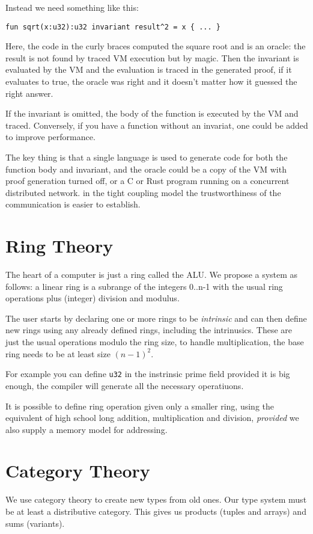 \documentclass[oneside]{book}
\theoremstyle{plain}
\theoremstyle{definition}
\theoremstyle{plain}
\begin{document}
Instead we need something like this:
\begin{verbatim}
fun sqrt(x:u32):u32 invariant result^2 = x { ... }
\end{verbatim}
Here, the code in the curly braces computed the square root
and is an oracle: the result is not found by traced VM execution
but by magic. Then the invariant is evaluated by the VM and
the evaluation is traced in the generated proof, if it evaluates
to true, the oracle was right and it doesn't matter how it guessed
the right answer.


If the invariant is omitted, the body of the function is executed
by the VM and traced. Conversely, if you have a function without
an invariat, one could be added to improve performance.

The key thing is that a single language is used to generate code for
both the function body and invariant, and the oracle could be a copy
of the VM with proof generation turned off, or a C or Rust program
running on a concurrent distributed network. in the tight coupling
model the trustworthiness of the communication is easier to establish.


\section{Ring Theory}
The heart of a computer is just a ring called the ALU. We propose
a system as follows: a linear ring is a subrange of the integers
0..n-1 with the usual ring operations plus (integer) division and
modulus.

The user starts by declaring one or more rings to be {\em intrinsic}
and can then define new rings using any already defined rings, including
the intrinusics. These are just the usual operations modulo the ring size,
to handle multiplication, the base ring needs to be at least size $(n-1)^2$.

For example you can define \verb$u32$ in the instrinsic prime field
provided it is big enough, the compiler will generate all the necessary
operatiuons.

It is possible to define ring operation given only a smaller ring,
using the equivalent of high school long addition, multiplication
and division, {\em provided} we also supply a memory model for
addressing.

\section{Category Theory}
We use category theory to create new types from old ones.
Our type system must be at least a distributive category.
This gives us products (tuples and arrays) and sums (variants).
\end{document}
